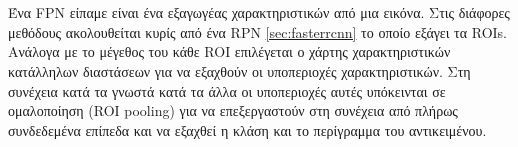 \paragraph{} \hspace{0em} \\
Ένα FPN είπαμε είναι ένα εξαγωγέας χαρακτηριστικών από μια εικόνα. Στις διάφορες
μεθόδους ακολουθείται κυρίς από ένα RPN \ref{sec:fasterrcnn} το οποίο εξάγει τα ROIs.
Ανάλογα με το μέγεθος του κάθε ROI επιλέγεται ο χάρτης χαρακτηριστικών κατάλληλων
διαστάσεων για να εξαχθούν οι υποπεριοχές χαρακτηριστικών. Στη συνέχεια κατά τα
γνωστά κατά τα άλλα οι υποπεριοχές αυτές υπόκεινται σε ομαλοποίηση (ROI pooling)
για να επεξεργαστούν στη συνέχεια από πλήρως συνδεδεμένα επίπεδα και να εξαχθεί
η κλάση και το περίγραμμα του αντικειμένου.
